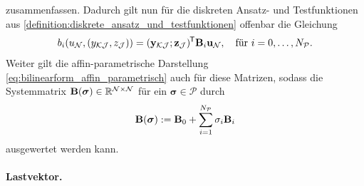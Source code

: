 \documentclass[../main.tex]{subfiles}
\begin{document}
zusammenfassen.
Dadurch gilt nun für die diskreten Ansatz- und Testfunktionen aus \cref{definition:diskrete_ansatz_und_testfunktionen} offenbar die Gleichung
\begin{equation}
    b_{i}(u_{\mathcal N}, (y_{\mathcal K \mathcal J}, z_{\mathcal J})) = (\mathbf{y}_{\mathcal K \mathcal J}; \mathbf{z}_{\mathcal J})^{\mkern-1.5mu\mathsf{T}} \mathbf{B}_{i} \mathbf{u}_{\mathcal N}, \quad \text{für } i = 0, \dots, N_{\mathcal P}.
\end{equation}
Weiter gilt die affin-parametrische Darstellung \cref{eq:bilinearform_affin_parametrisch} auch für diese Matrizen, sodass die Systemmatrix $\mathbf{B}(\bm \sigma) \in \mathbb{R}^{\mathcal N \times \mathcal N}$ für ein $\bm \sigma \in \mathcal P$ durch
\begin{equation}
    \mathbf{B}(\bm \sigma) := \mathbf{B}_{0} + \sum_{i = 1}^{N_{\mathcal P}} \sigma_{i} \mathbf{B}_{i}
\end{equation}
ausgewertet werden kann.


\paragraph{Lastvektor.} %
\label{par:lastvektor}
\end{document}
